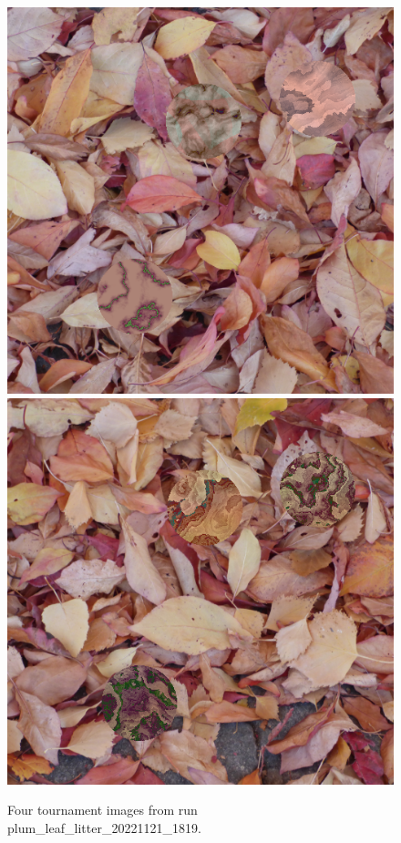 \documentclass[acmtog]{acmart}
\begin{document}
\begin{figure}
    \hfill
    \includegraphics[scale=0.24]{20221121_1819_step_6677.png}
    \hfill
    \includegraphics[scale=0.24]{20221121_1819_step_6755.png}
    \caption{Four tournament images from run plum\_leaf\_litter\_20221121\_1819.}
    \label{fig:plum_leaf_litter_4x}
\end{figure}
\end{document}
